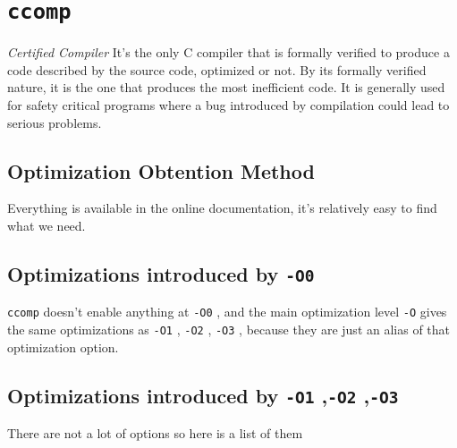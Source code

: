 \documentclass{rapport}
\newcommand{\comp}{\texttt{ccomp} }
\newcommand{\optizero}{\texttt{-O0} }
\newcommand{\optione}{\texttt{-O1} }
\newcommand{\optitwo}{\texttt{-O2} }
\newcommand{\optithree}{\texttt{-O3} }
\begin{document}
\section{\comp}
\textit{Certified Compiler}\newline
It's the only C compiler that is formally verified to produce a code described by the source code, optimized or not. By its formally verified nature, it is 
the one that produces the most inefficient code. It is generally used for safety critical programs where a bug introduced by compilation could lead to serious 
problems.

\subsection*{Optimization Obtention Method}
Everything is available in the online documentation, it's relatively easy to find what we need.
\subsection*{Optimizations introduced by \optizero}
\comp doesn't enable anything at \optizero, and the main optimization level \texttt{-O} gives the same optimizations as \optione, \optitwo, \optithree, because they are just an alias of that optimization option.
\subsection*{Optimizations introduced by \optione,\optitwo,\optithree}
There are not a lot of options so here is a list of them
\end{document}
